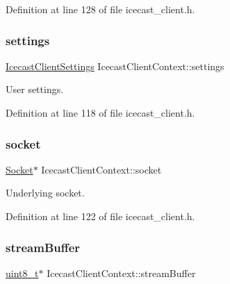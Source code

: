 Definition at line 128 of file icecast\+\_\+client.\+h.

\mbox{\label{structIcecastClientContext_a7db51aaf2d8cf4dab51f043a38df29bb}} 
\subsubsection{\texorpdfstring{settings}{settings}}
{\footnotesize\ttfamily \hyperlink{structIcecastClientSettings}{Icecast\+Client\+Settings} Icecast\+Client\+Context\+::settings}



User settings. 



Definition at line 118 of file icecast\+\_\+client.\+h.

\mbox{\label{structIcecastClientContext_a2369e7cffe879fc3b2111beedcae5ce0}} 
\subsubsection{\texorpdfstring{socket}{socket}}
{\footnotesize\ttfamily \hyperlink{socket_8h_aa85acfb0fa336ef495e6ba87fb88fc48}{Socket}$\ast$ Icecast\+Client\+Context\+::socket}



Underlying socket. 



Definition at line 122 of file icecast\+\_\+client.\+h.

\mbox{\label{structIcecastClientContext_aa4f023d844d1886ad8e38864c4dba447}} 
\subsubsection{\texorpdfstring{stream\+Buffer}{streamBuffer}}
{\footnotesize\ttfamily \hyperlink{stdint_8h_aba7bc1797add20fe3efdf37ced1182c5}{uint8\+\_\+t}$\ast$ Icecast\+Client\+Context\+::stream\+Buffer}



